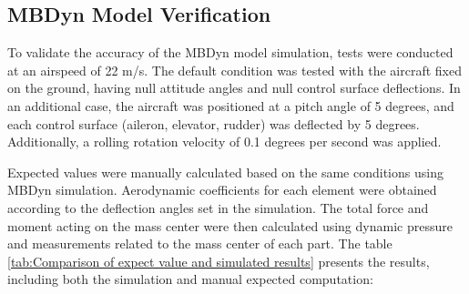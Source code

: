 \subsection{MBDyn Model Verification}
To validate the accuracy of the MBDyn model simulation, tests were conducted at an airspeed of 22 m/s. The default condition was tested with the aircraft fixed on the ground, having null attitude angles and null control surface deflections. In an additional case, the aircraft was positioned at a pitch angle of 5 degrees, and each control surface (aileron, elevator, rudder) was deflected by 5 degrees. Additionally, a rolling rotation velocity of 0.1 degrees per second was applied.

Expected values were manually calculated based on the same conditions using MBDyn simulation. Aerodynamic coefficients for each element were obtained according to the deflection angles set in the simulation. The total force and moment acting on the mass center were then calculated using dynamic pressure and measurements related to the mass center of each part. The table \ref{tab:Comparison of expect value and simulated results} presents the results, including both the simulation and manual expected computation:

